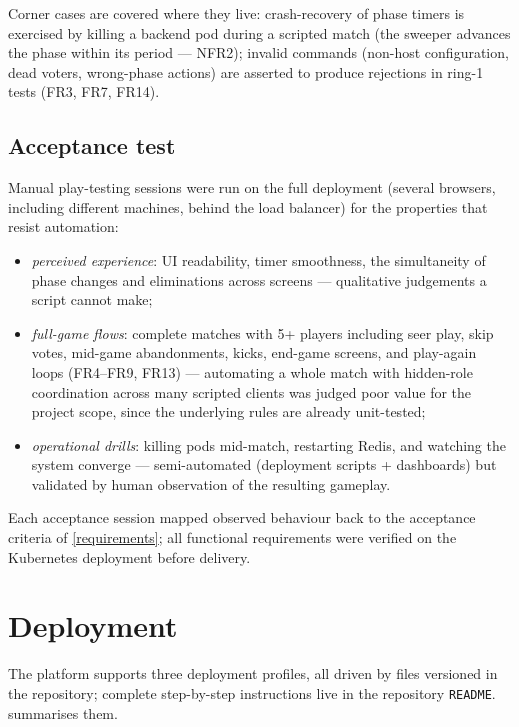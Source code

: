 \documentclass{scrartcl}
\begin{document}
Corner cases are covered where they live: crash-recovery of phase timers
is exercised by killing a backend pod during a scripted match (the
sweeper advances the phase within its period --- NFR2); invalid commands
(non-host configuration, dead voters, wrong-phase actions) are asserted
to produce rejections in ring-1 tests (FR3, FR7, FR14).

\subsection{Acceptance test}\label{acceptance-test}

Manual play-testing sessions were run on the full deployment (several
browsers, including different machines, behind the load balancer) for the
properties that resist automation:

\begin{itemize}
  \item \emph{perceived experience}: UI readability, timer smoothness,
  the simultaneity of phase changes and eliminations across screens ---
  qualitative judgements a script cannot make;
  \item \emph{full-game flows}: complete matches with 5+ players
  including seer play, skip votes, mid-game abandonments, kicks,
  end-game screens, and play-again loops (FR4--FR9, FR13) --- automating a
  whole match with hidden-role coordination across many scripted clients
  was judged poor value for the project scope, since the underlying
  rules are already unit-tested;
  \item \emph{operational drills}: killing pods mid-match, restarting
  Redis, and watching the system converge --- semi-automated (deployment
  scripts + dashboards) but validated by human observation of the
  resulting gameplay.
\end{itemize}

Each acceptance session mapped observed behaviour back to the acceptance
criteria of \cref{requirements}; all functional requirements were
verified on the Kubernetes deployment before delivery.

\section{Deployment}\label{deployment}

The platform supports three deployment profiles, all driven by files
versioned in the repository; complete step-by-step instructions live in
the repository \texttt{README}.  summarises them.
\end{document}
